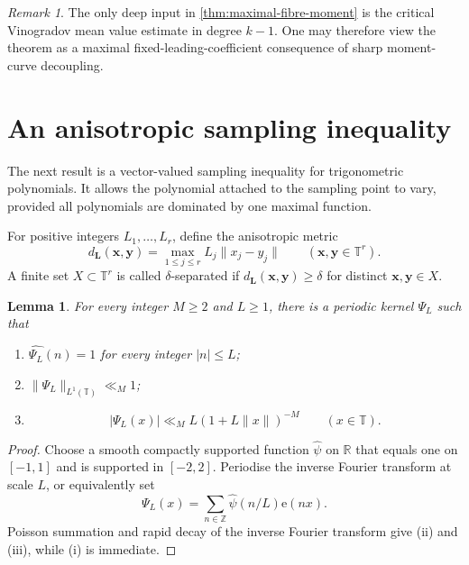 \documentclass[11pt,reqno]{amsart}
\numberwithin{equation}{section}
\newtheorem{lemma}[lemma]{Lemma}
\theoremstyle{definition}
\theoremstyle{remark}
\newtheorem{remark}[remark]{Remark}
\newcommand{\R}{\mathbb R}
\newcommand{\Z}{\mathbb Z}
\newcommand{\T}{\mathbb T}
\newcommand{\e}{\mathrm e}
\begin{document}
\begin{remark}\label{rem:maximal-decoupling}
The only deep input in \cref{thm:maximal-fibre-moment} is the critical Vinogradov mean value estimate in degree $k-1$.  One may therefore view the theorem as a maximal fixed-leading-coefficient consequence of sharp moment-curve decoupling.
\end{remark}

\section{An anisotropic sampling inequality}

The next result is a vector-valued sampling inequality for trigonometric polynomials.  It allows the polynomial attached to the sampling point to vary, provided all polynomials are dominated by one maximal function.

For positive integers $L_1,\ldots,L_r$, define the anisotropic metric
\begin{equation}\label{eq:anisotropic-metric}
  d_{\boldsymbol L}(\boldsymbol x,\boldsymbol y)
  =\max_{1\le j\le r}
  L_j\|x_j-y_j\|
  \qquad(\boldsymbol x,\boldsymbol y\in\T^r).
\end{equation}
A finite set $X\subset\T^r$ is called $\delta$-separated if
$d_{\boldsymbol L}(\boldsymbol x,\boldsymbol y)\ge\delta$ for distinct $\boldsymbol x,\boldsymbol y\in X$.

\begin{lemma}\label{lem:reproducing-kernel}
For every integer $M\ge2$ and $L\ge1$, there is a periodic kernel $\Psi_L$ such that
\begin{enumerate}[label=\textup{(\roman*)}]
\item $\widehat{\Psi_L}(n)=1$ for every integer $|n|\le L$;
\item $\|\Psi_L\|_{L^1(\T)}\ll_M1$;
\item
\[
  |\Psi_L(x)|
  \ll_M L(1+L\|x\|)^{-M}
  \qquad(x\in\T).
\]
\end{enumerate}
\end{lemma}

\begin{proof}
Choose a smooth compactly supported function $\widehat\psi$ on $\R$ that equals one on $[-1,1]$ and is supported in $[-2,2]$.  Periodise the inverse Fourier transform at scale $L$, or equivalently set
\[
  \Psi_L(x)=\sum_{n\in\Z}\widehat\psi(n/L)\e(nx).
\]
Poisson summation and rapid decay of the inverse Fourier transform give (ii) and (iii), while (i) is immediate.
\end{proof}
\end{document}
